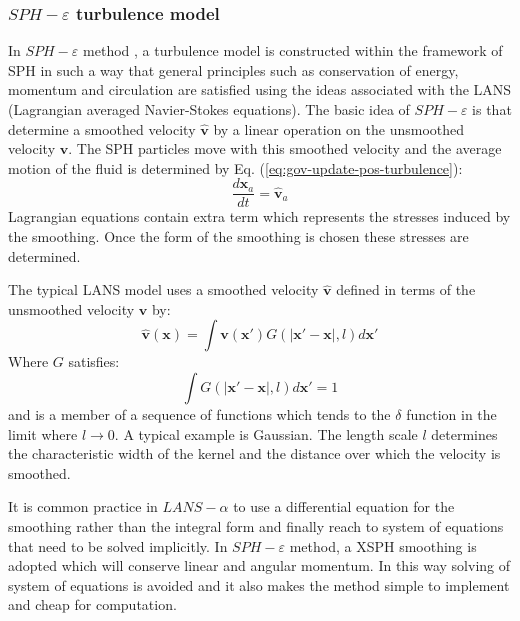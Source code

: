 \documentclass[journal abbreviation, manuscript]{copernicus}
\begin{document}
\subsubsection{$SPH-\varepsilon$ turbulence model}
In $SPH-\varepsilon$ method \citep{monaghan2011turbulence}, a turbulence model is constructed within the framework of SPH in such a way that general principles such as conservation of energy, momentum and circulation are satisfied using the ideas associated with the LANS (Lagrangian averaged Navier-Stokes equations). The basic idea of $SPH-\varepsilon$ is that determine a smoothed velocity $\widehat{\textbf{v}}$ by a linear operation on the unsmoothed velocity $\textbf{v}$. The SPH particles move with this smoothed velocity and the average motion of the fluid is determined by Eq. (\ref{eq:gov-update-pos-turbulence}):
\begin{equation}
\dfrac{d \textbf{x}_a}{dt} = \widehat{\textbf{v}}_a \label{eq:gov-update-pos-turbulence}
\end{equation}
Lagrangian equations contain extra term which represents the stresses induced by the smoothing. Once the form of the smoothing is chosen these stresses are determined. 

The typical LANS model uses a smoothed velocity $\widehat{\textbf{v}}$ 
defined in terms of the unsmoothed velocity $\textbf{v}$ by:
\begin{equation}
\widehat{\textbf{v}}(\textbf{x})=\int \textbf{v}(\textbf{x} \prime)G(\vert \textbf{x} \prime - \textbf{x} \vert, l) d\textbf{x} \prime
\end{equation}
Where $G$ satisfies:
\begin{equation}
\int G(\vert \textbf{x} \prime - \textbf{x} \vert, l) d\textbf{x} \prime =1
\end{equation}
and is a member of a sequence of functions which tends to the $\delta$ function in the limit where $ l\rightarrow 0$. A typical example is Gaussian.
The length scale $l$ determines the characteristic width of the kernel and the distance over which the velocity is smoothed.

It is common practice in $LANS-\alpha$ to use a differential equation for the smoothing rather than the integral form and finally reach to system of equations that need to be solved implicitly. In $SPH-\varepsilon$ method, a XSPH smoothing is adopted which will conserve linear and angular momentum. In this way solving of system of equations is avoided and it also makes the method simple to implement and cheap for computation. 
\end{document}
